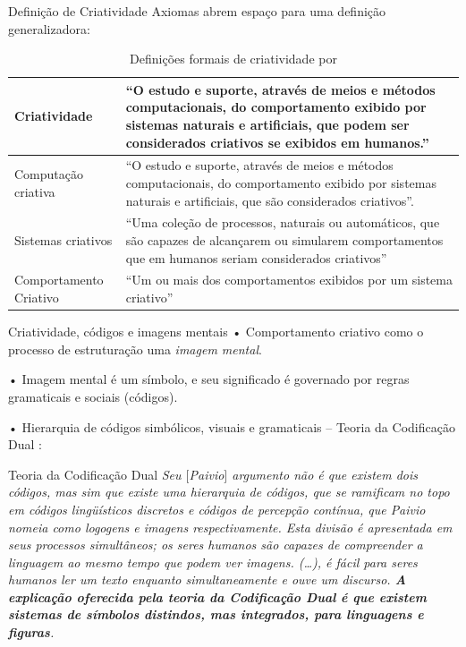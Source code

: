 \documentclass[aspectratio=169]{beamer}
\begin{document}
\begin{frame}{Definição de Criatividade}
Axiomas abrem espaço para uma definição generalizadora:

\begin{table}[!h]
\caption{Definições formais de criatividade por }
\small
    \begin{tabular}{ | p{4cm} | p{7.25cm} |}
    \hline 
    \hline 

    \tiny{Criatividade} 
    & \tiny{``O estudo e suporte, através de meios e métodos computacionais, do comportamento exibido por sistemas naturais e artificiais, que podem ser considerados criativos se exibidos em humanos.'' } \\
    \hline

    \tiny{Computação criativa} 
    & \tiny{``O estudo e suporte, através de meios e métodos computacionais, do comportamento exibido por sistemas naturais e artificiais, que são considerados criativos''. } \\
    \hline

    \tiny{Sistemas criativos} 
    & \tiny{``Uma coleção de processos, naturais ou automáticos, que são capazes de alcançarem ou simularem comportamentos que em humanos seriam considerados criativos''} \\
    \hline

    \tiny{Comportamento Criativo} 
    & \tiny{``Um ou mais dos comportamentos exibidos por um sistema criativo''} \\
    \hline
    \hline
   
    \end{tabular}
\label{tab:criatividade}
\end{table}
\end{frame}

\begin{frame}{Criatividade, códigos e imagens mentais}
• Comportamento criativo como o processo de estruturação uma \emph{imagem mental}.

• Imagem mental é um símbolo, e seu significado é governado por regras gramaticais e sociais (códigos). 

• Hierarquia de códigos simbólicos, visuais e gramaticais -- Teoria da Codificação Dual :
\end{frame}

\begin{frame}{Teoria da Codificação Dual}
\emph{Seu $[$Paivio$]$ argumento não é que existem dois códigos, mas sim que existe uma hierarquia de códigos, que se ramificam no topo em códigos lingüísticos discretos e códigos de percepção contínua, que Paivio nomeia como \emph {logogens} e \emph{imagens} respectivamente. Esta divisão é apresentada em seus processos simultâneos; os seres humanos são capazes de compreender a linguagem ao mesmo tempo que podem ver imagens. (\ldots), é fácil para seres humanos ler um texto enquanto simultaneamente e ouve um discurso. \textbf{A explicação oferecida pela teoria da Codificação Dual é que existem sistemas de símbolos distindos, mas integrados, para linguagens e figuras}.}
\end{frame}
\end{document}
